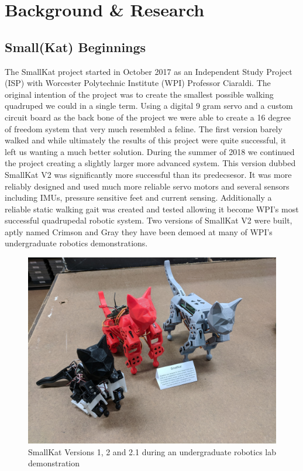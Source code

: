 \graphicspath{ {./figures/} }

\section{Background \& Research}
    \label{chap:background}
    \subsection{Small(Kat) Beginnings} \label{subsec:SmallKatVersions}
        The SmallKat project started in October 2017 as an Independent Study Project (ISP) with Worcester Polytechnic Institute (WPI) Professor Ciaraldi. The original intention of the project was to create the smallest possible walking quadruped we could in a single term. Using a digital 9 gram servo and a custom circuit board as the back bone of the project we were able to create a 16 degree of freedom system that very much resembled a feline. The first version barely walked and while ultimately the results of this project were quite successful, it left us wanting a much better solution. During the summer of 2018 we continued the project creating a slightly larger more advanced system. This version dubbed SmallKat V2 was significantly more successful than its predecsesor. It was more reliably designed and used much more reliable servo motors and several sensors including IMUs, pressure sensitive feet and current sensing. Additionally a reliable static walking gait was created and tested allowing it become WPI's most successful quadrupedal robotic system. Two versions of SmallKat V2 were built, aptly named Crimson and Gray they have been demoed at many of WPI's undergraduate robotics demonstrations. 
        
        \begin{figure}[H]
            \centering
            \includegraphics[width=120mm]{figures/V1andV2.jpg}
            \caption{SmallKat Versions 1, 2 and 2.1 during an undergraduate robotics lab demonstration}
            \label{fig:SmallKatVersions}
        \end{figure}
